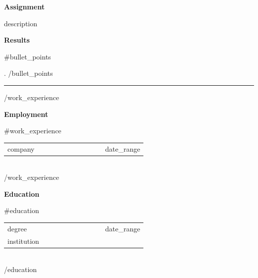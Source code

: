 \documentclass[11pt,a4paper]{article}
\newcommand{\sectiontitle}[1]{%
  {\fontsize{20}{26}\selectfont\bfseries\textcolor{vywhite}{#1}}}
\newcommand{\fieldlabel}[1]{{\bfseries\textcolor{vywhite}{#1}}}
\begin{document}
\vspace{0.6em}

\fieldlabel{Assignment}

\smallskip
{{description}}

\vspace{0.6em}

\fieldlabel{Results}

\vspace{0.3em}

{{#bullet_points}}
\par\noindent\hspace{1.2em}\raisebox{0.1ex}{\textbullet}\hspace{0.6em}%
{{.}}
{{/bullet_points}}

\vspace{1em}
{\color{vygray}\rule{\linewidth}{0.3pt}}
\vspace{0.5em}

{{/work_experience}}

\newpage
\vspace*{0.8cm}

\sectiontitle{Employment}

\vspace{0.7em}

{{#work_experience}}
\noindent
\begin{tabular}{@{}p{0.70\linewidth}r@{}}
  \textcolor{vywhite}{{{company}}} &
  \textcolor{vywhite}{{{date_range}}} \\
\end{tabular}\\[0.25em]
{{/work_experience}}

\vspace{1.2em}

\sectiontitle{Education}

\vspace{0.7em}

{{#education}}
\noindent
\begin{tabular}{@{}p{0.70\linewidth}r@{}}
  \textcolor{vywhite}{{{degree}}} &
  \textcolor{vywhite}{{{date_range}}} \\
  \multicolumn{2}{l}{\textcolor{vygray}{{{institution}}}} \\
\end{tabular}\\[0.8em]
{{/education}}
\end{document}
